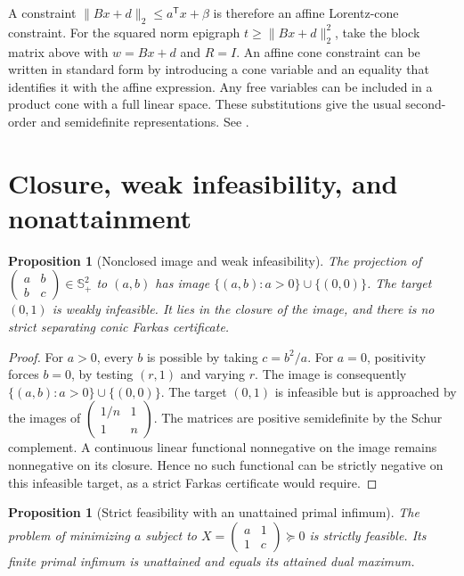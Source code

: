\documentclass[11pt,oneside,openany]{book}
\theoremstyle{plain}
\newtheorem{proposition}[theorem]{Proposition}
\theoremstyle{definition}
\theoremstyle{remark}
\begin{document}
A constraint \(\|Bx+d\|_2\le a^{\mathsf T}x+\beta\)
is therefore an affine Lorentz-cone constraint.
For the squared norm epigraph
\(t\ge\|Bx+d\|_2^2\), take the block matrix above
with \(w=Bx+d\) and \(R=I\).
An affine cone constraint can be written in standard
form by introducing a cone variable and an equality
that identifies it with the affine expression. Any free
variables can be included in a product cone with
a full linear space. These substitutions give the
usual second-order and semidefinite representations.
See \cite[Sections 2.6 and 4.4--4.6 and Appendix A]{Boyd}.

\section{Closure, weak infeasibility, and nonattainment}
\label{v05-05}

\begin{proposition}[Nonclosed image and weak infeasibility]\label{prop:sdp-weak-infeasibility}
The projection of \(\begin{pmatrix}a&b\\b&c\end{pmatrix}\in\mathbb S^2_+\)
to \((a,b)\) has image \(\{(a,b):a>0\}\cup\{(0,0)\}\).
The target \((0,1)\) is weakly infeasible. It lies in the closure of the
image, and there is no strict separating conic Farkas certificate.
\end{proposition}

\begin{proof}
For \(a>0\), every \(b\) is possible
by taking \(c=b^2/a\). For \(a=0\), positivity
forces \(b=0\), by testing \((r,1)\) and varying \(r\).
The image is consequently
\(\{(a,b):a>0\}\cup\{(0,0)\}\).
The target \((0,1)\) is infeasible but is approached
by the images of
\(\begin{pmatrix}1/n&1\\1&n\end{pmatrix}\).
The matrices are positive semidefinite by the
Schur complement. A continuous linear functional
nonnegative on the image remains nonnegative on
its closure. Hence no such functional can be
strictly negative on this infeasible target,
as a strict Farkas certificate would require.
\end{proof}

\begin{proposition}[Strict feasibility with an unattained primal infimum]\label{prop:sdp-nonattainment}
The problem of minimizing \(a\) subject to
\(X=\begin{pmatrix}a&1\\1&c\end{pmatrix}\succeq0\) is strictly feasible.
Its finite primal infimum is unattained and equals its attained dual maximum.
\end{proposition}
\end{document}

